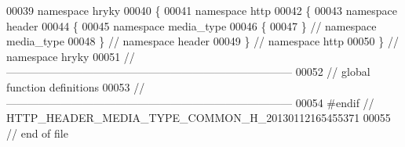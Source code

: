 \begin{DoxyCode}
00039 \textcolor{keyword}{namespace }hryky
00040 \{
00041 \textcolor{keyword}{namespace }http
00042 \{
00043 \textcolor{keyword}{namespace }header
00044 \{
00045 \textcolor{keyword}{namespace }media\_type
00046 \{
00047 \} \textcolor{comment}{// namespace media\_type}
00048 \} \textcolor{comment}{// namespace header}
00049 \} \textcolor{comment}{// namespace http}
00050 \} \textcolor{comment}{// namespace hryky}
00051 \textcolor{comment}{//
      ------------------------------------------------------------------------------}
00052 \textcolor{comment}{// global function definitions}
00053 \textcolor{comment}{//
      ------------------------------------------------------------------------------}
00054 \textcolor{preprocessor}{#endif // HTTP\_HEADER\_MEDIA\_TYPE\_COMMON\_H\_20130112165455371}
00055 \textcolor{preprocessor}{}\textcolor{comment}{// end of file}
\end{DoxyCode}

